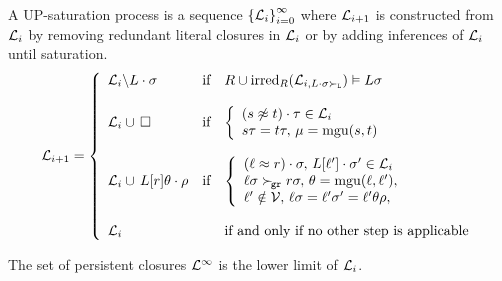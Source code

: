    \begin{definition}[UP-Saturation]

            A UP-{saturation process}
            is a sequence \( {\{ \mathcal{L}_i \}}_{i=0}^\infty \)
            where \( \mathcal{L}_{i+1} \) is constructed from \( \mathcal{L}_i \)
            by removing redundant literal closures in \( \mathcal{L}_i \)
            or by adding inferences of \( \mathcal{L}_i \) until saturation.
           \begin{gather*}
           \mathcal{L}_{i+1} = \left \{
                   \begin{array}{lclc}
                       \mathcal{L}_i \backslash L\cdot\sigma
                        &\text{if}
                        &R \cup \operatorname{irred}_R(\mathcal{L}_{i,L\cdot\sigma\mathrel\succ_{\mathtt{L}}}) \vDash L\sigma
                       \\
                       \\
                       \mathcal{L}_i \cup \, \square
                        &\text{if}
                        &\left \{ \begin{array}{l}
                            (s\not\approx t)\cdot\tau\in\mathcal{L}_i
                           \\
                            s\tau = t\tau,\,
                           \mu=\operatorname{mgu}(s,t)
                       \end{array}\right.
                       \\
                       \\
                       \mathcal{L}_i \cup{} \, L[r]\theta\cdot\rho{}
                        &\text{if}
                        &\left \{ \begin{array}{l}
                            (\ell\approx r)\cdot\sigma,\,
                            L[\ell']\cdot\sigma'\in\mathcal{L}_i
                           \\
                           \ell\sigma\mathrel\succ_{\!\mathtt{gr}} r\sigma,\,
                           \theta=\operatorname{mgu}(\ell,\ell'),
                           \\
                           \ell'\notin\mathcal{V},\,
                           \ell\sigma = \ell'\sigma' = \ell'\theta\rho,
                       \end{array}\right.
                       \\
                       \\
                       \mathcal{L}_i
                        &&\text{if and only if no other step is applicable}
                   \end{array}
               \right.
               \end{gather*}

            The set of persistent closures \( \mathcal{L}^\infty \) is the lower limit of \( \mathcal{L}_i \).

   \end{definition}
